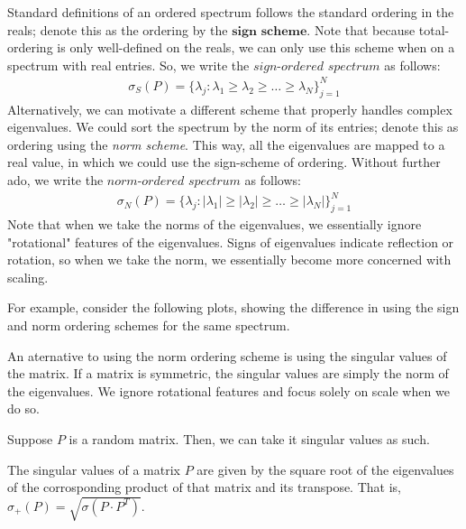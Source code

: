 Standard definitions of an ordered spectrum follows the standard ordering in the reals; denote this as the ordering by the $\textbf{sign scheme}$. Note that because total-ordering is only well-defined on the reals, we can only use this scheme when on a spectrum with real entries. So, we write the $\textit{sign-ordered spectrum}$ as follows:
\begin{align*}
\sigma_S(P) = \{\lambda_j : \lambda_1 \geq \lambda_2 \geq \dots \geq \lambda_N\}_{j = 1}^N
\end{align*}
Alternatively, we can motivate a different scheme that properly handles complex eigenvalues. We could sort the spectrum by the norm of its entries; denote this as ordering using the \textit{norm scheme}. This way, all the eigenvalues are mapped to a real value, in which we could use the sign-scheme of ordering. Without further ado, we write the $\textit{norm-ordered spectrum}$ as follows:
\begin{align*}
\sigma_N(P) = \{\lambda_j : |\lambda_1| \geq |\lambda_2| \geq \dots \geq |\lambda_N|\}_{j = 1}^N
\end{align*}
Note that when we take the norms of the eigenvalues, we essentially ignore "rotational" features of the eigenvalues. Signs of eigenvalues indicate reflection or rotation, so when we take the norm, we essentially become more concerned with scaling.

For example, consider the following plots, showing the difference in using the sign and norm ordering schemes for the same spectrum.


\newpage
{}

An aternative to using the norm ordering scheme is using the singular values of the matrix. If a matrix is symmetric, the singular values are simply the norm of the eigenvalues. We ignore rotational features and focus solely on scale when we do so.

Suppose $P$ is a random matrix. Then, we can take it singular values as such.

\begin{definition}
The singular values of a matrix $P$ are given by the square root of the eigenvalues of the corrosponding product of that matrix and its transpose. That is, $\sigma_+(P) = \sqrt{\sigma(P \cdot P^T)}$.
\end{definition}


